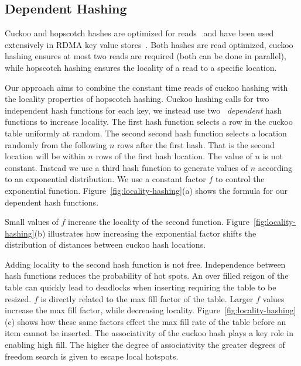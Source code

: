 \subsection{Dependent Hashing}

Cuckoo and hopscotch hashes are optimized for
reads~\cite{cuckoo,hopscotch} and have been used extensively
in RDMA key value
stores~\cite{memc3,cuckoo-improvements,pilaf,farm}. Both
hashes are read optimized, cuckoo hashing ensures at most
two reads are required (both can be done in parallel), while
hopscotch hashing ensures the locality of a read to a
specific location.

Our approach aims to combine the constant time reads of
cuckoo hashing with the locality properties of hopscotch
hashing. Cuckoo hashing calls for two independent hash
functions for each key, we instead use two
~\textit{dependent} hash functions to increase locality. The
first hash function selects a row in the cuckoo table
uniformly at random. The second second hash function selects
a location randomly from the following $n$ rows after the
first hash. That is the second location will be within $n$
rows of the first hash location. The value of $n$ is not
constant. Instead we use a third hash function to generate
values of $n$ according to an exponential distribution. We
use a constant factor $f$ to control the exponential
function.  Figure~\ref{fig:locality-hashing}(a) shows the
formula for our dependent hash functions.

Small values of $f$ increase the locality of the second
function.  Figure~\ref{fig:locality-hashing}(b) illustrates
how increasing the exponential factor shifts the
distribution of distances between cuckoo hash locations.

Adding locality to the second hash function is not free.
Independence between hash functions reduces the probability
of hot spots. An over filled reigon of the table can quickly
lead to deadlocks when inserting requiring the table to be
resized. $f$ is directly related to the max fill factor of
the table. Larger $f$ values increase the max fill factor,
while decreasing locality.
Figure~\ref{fig:locality-hashing}(c) shows how these same
factors effect the max fill rate of the table before an item
cannot be inserted. The associativity of the cuckoo hash
plays a key role in enabling high fill. The higher the
degree of associativity the greater degrees of freedom
search is given to escape local hotspots.


